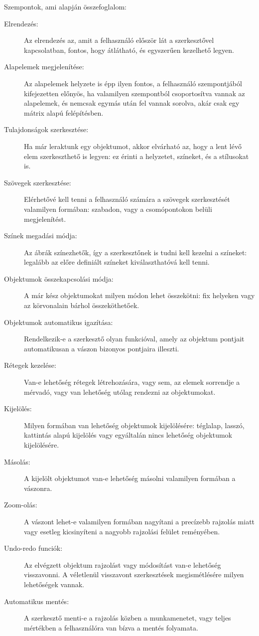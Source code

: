 
Szempontok, ami alapján összefoglalom:

\begin{description}
	\item[Elrendezés:] Az elrendezés az, amit a felhasználó először lát a szerkesztővel kapcsolatban, fontos, hogy átlátható, és egyszerűen kezelhető legyen.
	\item[Alapelemek megjelenítése:] Az alapelemek helyzete is épp ilyen fontos, a felhasználó szempontjából kifejezetten előnyös, ha valamilyen szempontból csoportosítva vannak az alapelemek, és nemcsak egymás után fel vannak sorolva, akár csak egy mátrix alapú felépítésben.
	\item[Tulajdonságok szerkesztése:] Ha már leraktunk egy objektumot, akkor elvárható az, hogy a lent lévő elem szerkeszthető is legyen: ez érinti a helyzetet, színeket, és a stílusokat is.
	\item[Szövegek szerkesztése:] Elérhetővé kell tenni a felhasználó számára a szövegek szerkesztését valamilyen formában: szabadon, vagy a csomópontokon belüli megjelenítést.
	\item[Színek megadási módja:] Az ábrák színezhetők, így a szerkesztőnek is tudni kell kezelni a színeket: legalább az előre definiált színeket kiválaszthatóvá kell tenni.
	\item[Objektumok összekapcsolási módja:] A már kész objektumokat milyen módon lehet összekötni: fix helyeken vagy az körvonalain bárhol összeköthetőek.
	\item[Objektumok automatikus igazítása:] Rendelkezik-e a szerkesztő olyan funkcióval, amely az objektum pontjait automatikusan a vászon bizonyos pontjaira illeszti.
	\item[Rétegek kezelése:] Van-e lehetőség rétegek létrehozására, vagy sem, az elemek sorrendje a mérvadó, vagy van lehetőség utólag rendezni az objektumokat. 
	\item[Kijelölés:] Milyen formában van lehetőség objektumok kijelölésére: téglalap, lasszó, kattintás alapú kijelölés vagy egyáltalán nincs lehetőség objektumok kijelölésére.
	\item[Másolás:] A kijelölt objektumot van-e lehetőség másolni valamilyen formában a vászonra.
	\item[Zoom-olás:] A vászont lehet-e valamilyen formában nagyítani a precízebb rajzolás miatt vagy esetleg kicsinyíteni a nagyobb rajzolási felület reményében.
	\item[Undo-redo funciók:] Az elvégzett objektum rajzolást vagy módosítást van-e lehetőség visszavonni. A véletlenül visszavont szerkesztések megismétlésére milyen lehetőségek vannak.
	\item[Automatikus mentés:] A szerkesztő menti-e a rajzolás közben a munkamenetet, vagy teljes mértékben a felhasználóra van bízva a mentés folyamata.
\end{description}

